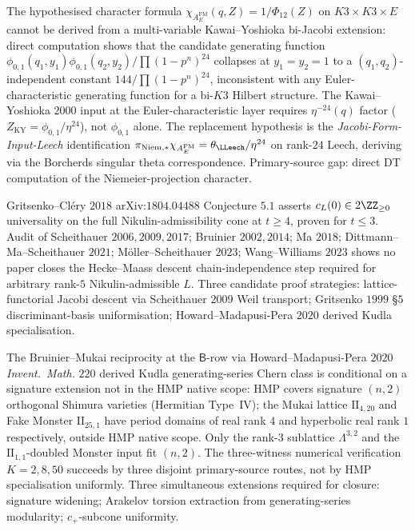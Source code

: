 \begin{remark}
\label{wn:frontier:wave3-JFI-Leech}\ClaimStatusOpen
The hypothesised character formula
$\chi_{A^{\mathrm{FM}}_E}(q, Z) = 1/\Phi_{12}(Z)$ on
$K3 \times K3 \times E$ cannot be derived from a multi-variable
Kawai--Yoshioka bi-Jacobi extension: direct computation shows that
the candidate generating function $\phi_{0,1}(q_1, y_1) \phi_{0,1}(q_2,
y_2)/\prod(1 - p^n)^{24}$ collapses at $y_1 = y_2 = 1$ to a
$(q_1, q_2)$-independent constant $144/\prod(1 - p^n)^{24}$,
inconsistent with any Euler-characteristic generating function for a
bi-$K3$ Hilbert structure. The Kawai--Yoshioka $2000$ input at the
Euler-characteristic layer requires $\eta^{-24}(q)$
factor ($Z_{\mathrm{KY}} = \phi_{0, 1}/\eta^{24}$), not $\phi_{0, 1}$
alone. The replacement hypothesis is the
\emph{Jacobi-Form-Input-Leech} identification
$\pi_{\mathrm{Niem}, *} \chi_{A^{\mathrm{FM}}_E} =
\theta_{\LLeech}/\eta^{24}$ on rank-$24$ Leech, deriving via the
Borcherds singular theta correspondence. Primary-source gap: direct
DT computation of the Niemeier-projection character.
\end{remark}

\begin{remark}
\label{wn:frontier:wave3-GC-Conj51}\ClaimStatusOpen
Gritsenko--Cl\'ery $2018$ arXiv:$1804.04488$ Conjecture $5.1$ asserts
$c_L(0) \in 2\ZZ_{\geq 0}$ universality on the full
Nikulin-admissibility cone at $t \geq 4$, proven for $t \leq 3$.
Audit of Scheithauer $2006, 2009, 2017$; Bruinier $2002, 2014$;
Ma $2018$; Dittmann--Ma--Scheithauer $2021$; M\"oller--Scheithauer
$2023$; Wang--Williams $2023$ shows no paper closes the Hecke--Maass
descent chain-independence step required for arbitrary rank-$5$
Nikulin-admissible $L$. Three candidate proof strategies:
lattice-functorial Jacobi descent via Scheithauer $2009$ Weil
transport; Gritsenko $1999$ \S$5$ discriminant-basis uniformisation;
Howard--Madapusi-Pera $2020$ derived Kudla specialisation.
\end{remark}

\begin{remark}
\label{wn:frontier:wave3-HMP-signature}\ClaimStatusOpen
The Bruinier--Mukai reciprocity at the $\mathsf{B}$-row via
Howard--Madapusi-Pera $2020$ \emph{Invent.~Math.} $220$ derived
Kudla generating-series Chern class is conditional on a signature
extension not in the HMP native scope: HMP covers signature
$(n, 2)$ orthogonal Shimura varieties (Hermitian Type~IV); the Mukai
lattice $\mathrm{II}_{4, 20}$ and Fake Monster $\mathrm{II}_{25, 1}$
have period domains of real rank $4$ and hyperbolic real rank $1$
respectively, outside HMP native scope. Only the rank-$3$ sublattice
$\Lambda^{3, 2}$ and the $\mathrm{II}_{1, 1}$-doubled Monster input
fit $(n, 2)$. The three-witness numerical verification $K = 2, 8, 50$
succeeds by three disjoint primary-source routes, not by HMP
specialisation uniformly. Three simultaneous extensions required for
closure: signature widening; Arakelov torsion extraction from
generating-series modularity; $c_+$-subcone uniformity.
\end{remark}

